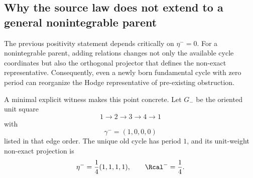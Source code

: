 \subsection{Why the source law does not extend to a general nonintegrable parent}

The previous positivity statement depends critically on $\eta^-=0$. For a nonintegrable parent, adding relations changes not only the available cycle coordinates but also the orthogonal projector that defines the non-exact representative. Consequently, even a newly born fundamental cycle with zero period can reorganize the Hodge representative of pre-existing obstruction.

A minimal explicit witness makes this point concrete. Let $G_-$ be the oriented unit square
\begin{equation}
1\to2\to3\to4\to1
\end{equation}
with
\begin{equation}
\gamma^-=(1,0,0,0)
\end{equation}
listed in that edge order. The unique old cycle has period $1$, and its unit-weight non-exact projection is
\begin{equation}
\eta^-=\frac14(1,1,1,1),
\qquad
\Rcal^-=\frac14.
\label{eq:square-old-R}
\end{equation}

